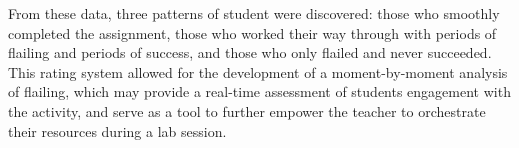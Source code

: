 From these data, three patterns of student were discovered: those who smoothly completed the assignment, those who worked their way through with periods of flailing and periods of success, and those who only flailed and never succeeded. This rating system allowed for the development of a moment-by-moment analysis of flailing, which may provide a real-time assessment of students engagement with the activity, and serve as a tool to further empower the teacher to orchestrate their resources during a lab session.


